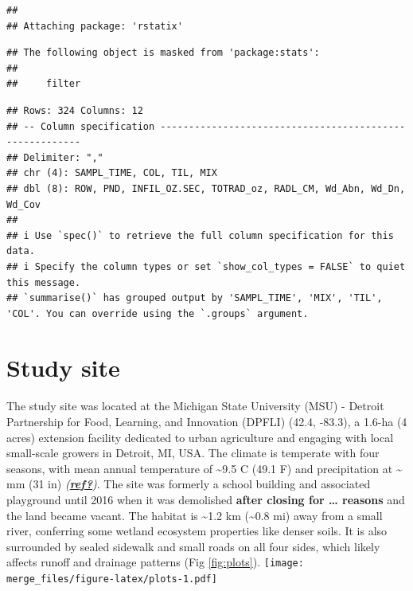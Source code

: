 \documentclass[
]{article}
\begin{document}
\begin{verbatim}
## 
## Attaching package: 'rstatix'
\end{verbatim}

\begin{verbatim}
## The following object is masked from 'package:stats':
## 
##     filter
\end{verbatim}

\begin{verbatim}
## Rows: 324 Columns: 12
## -- Column specification --------------------------------------------------------
## Delimiter: ","
## chr (4): SAMPL_TIME, COL, TIL, MIX
## dbl (8): ROW, PND, INFIL_OZ.SEC, TOTRAD_oz, RADL_CM, Wd_Abn, Wd_Dn, Wd_Cov
## 
## i Use `spec()` to retrieve the full column specification for this data.
## i Specify the column types or set `show_col_types = FALSE` to quiet this message.
## `summarise()` has grouped output by 'SAMPL_TIME', 'MIX', 'TIL', 'COL'. You can override using the `.groups` argument.
\end{verbatim}

\hypertarget{study-site}{%
\section{Study site}\label{study-site}}

The study site was located at the Michigan State University (MSU) - Detroit Partnership for Food, Learning, and Innovation (DPFLI) (42.4, -83.3), a 1.6-ha (4 acres) extension facility dedicated to urban agriculture and engaging with local small-scale growers in Detroit, MI, USA.
The climate is temperate with four seasons, with mean annual temperature of \textasciitilde9.5 C (49.1 F) and precipitation at \textasciitilde{} mm (31 in) \emph{(\protect\hyperlink{ref-ref}{\textbf{ref?}})}.
The site was formerly a school building and associated playground until 2016 when it was demolished \textbf{after closing for \ldots{} reasons} and the land became vacant.
The habitat is \textasciitilde1.2 km (\textasciitilde0.8 mi) away from a small river, conferring some wetland ecosystem properties like denser soils.
It is also surrounded by sealed sidewalk and small roads on all four sides, which likely affects runoff and drainage patterns (Fig \ref{fig:plots}).
\texttt{[image: merge\_files/figure-latex/plots-1.pdf]}
\end{document}
